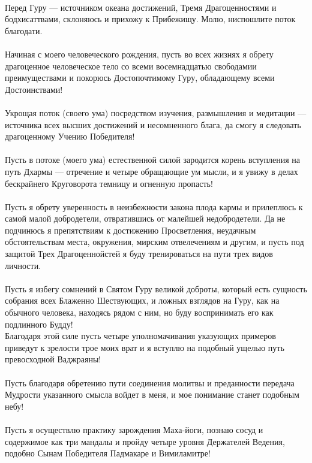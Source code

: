 \\
\ru
Перед Гуру — источником океана достижений,
Тремя Драгоце\-нностями и бодхисаттвами,
склоняюсь и прихожу к Прибежищу.
Молю, ниспошлите поток благодати.\\
\\
Начиная с моего человеческого рождения,
пусть во всех жизнях я обрету драгоценное человеческое тело
со всеми восемнадцатью свободамии преимуществами
и покорюсь Дос\-топочтимому Гуру,
обладающему всеми Достоинствами!\\
\\
Укрощая поток (своего ума) посредством изучения,
размышле\-ния и медитации — источника всех
высших достижений и несомненного блага,
да смогу я следовать драгоценному Учению Победителя!\\
\\
Пусть в потоке (моего ума) естественной силой
зародится корень вступления на путь Дхармы —
отречение и четыре обращающие ум мысли,
и я увижу в делах бескрайнего Круго\-ворота
темницу и огненную пропасть!\\
\\
Пусть я обрету уверенность в неизбежности закона плода кармы
и прилеплюсь к самой малой добродетели,
отвратившись от малейшей недобродетели.
Да не подчинюсь я препятствиям к достижению Просветления,
неудачным обстоятельствам места, окружения,
мирским отвелечениям и другим, и пусть под защитой
Трех Драгоценнойстей я буду тренироваться на пути трех видов личности.\\
\\
Пусть я избегу сомнений в Святом Гуру великой доброты,
который есть сущность собрания всех Блаженно Шествующих,
и ложных взглядов на Гуру, как на обычного человека,
находясь рядом с ним, но буду воспринимать его как подлинного Будду!
\\
Благодаря этой силе пусть четыре уполномачивания
указующих примеров приведут к зрелости трое моих врат
и я вступлю на подобный ущелью путь превосходной Ваджраяны!\\
\\
Пусть благодаря обретению пути соединения молитвы и преда\-нности
передача Мудрости указанного смысла войдет в меня,
и мое понимание станет подобным небу!\\
\\
Пусть я осуществлю практику зарождения Маха-йоги,
познаю сосуд и содержимое как три мандалы и пройду четыре
уровня Держателей Ведения, подобно Сынам Победителя
Падмакаре и Вимиламитре!\\
\\
